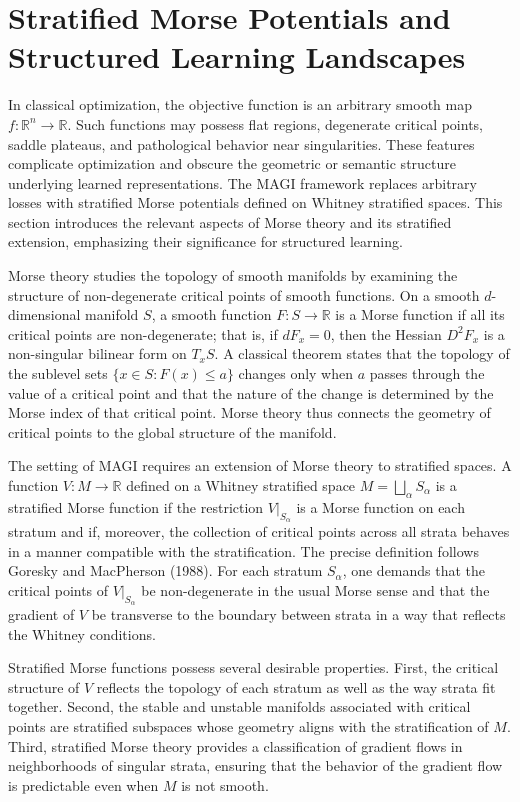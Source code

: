 \documentclass[12pt]{article}
\begin{document}
\section{Stratified Morse Potentials and Structured Learning Landscapes}

In classical optimization, the objective function is an arbitrary smooth map $f : \mathbb{R}^n \to \mathbb{R}$. Such functions may possess flat regions, degenerate critical points, saddle plateaus, and pathological behavior near singularities. These features complicate optimization and obscure the geometric or semantic structure underlying learned representations. The MAGI framework replaces arbitrary losses with stratified Morse potentials defined on Whitney stratified spaces. This section introduces the relevant aspects of Morse theory and its stratified extension, emphasizing their significance for structured learning.

Morse theory studies the topology of smooth manifolds by examining the structure of non-degenerate critical points of smooth functions. On a smooth $d$-dimensional manifold $S$, a smooth function $F : S \to \mathbb{R}$ is a Morse function if all its critical points are non-degenerate; that is, if $dF_x = 0$, then the Hessian $D^2 F_x$ is a non-singular bilinear form on $T_x S$. A classical theorem states that the topology of the sublevel sets $\{x \in S : F(x) \leq a\}$ changes only when $a$ passes through the value of a critical point and that the nature of the change is determined by the Morse index of that critical point. Morse theory thus connects the geometry of critical points to the global structure of the manifold.

The setting of MAGI requires an extension of Morse theory to stratified spaces. A function $V : M \to \mathbb{R}$ defined on a Whitney stratified space $M = \bigsqcup_{\alpha} S_\alpha$ is a stratified Morse function if the restriction $V|_{S_\alpha}$ is a Morse function on each stratum and if, moreover, the collection of critical points across all strata behaves in a manner compatible with the stratification. The precise definition follows Goresky and MacPherson (1988). For each stratum $S_\alpha$, one demands that the critical points of $V|_{S_\alpha}$ be non-degenerate in the usual Morse sense and that the gradient of $V$ be transverse to the boundary between strata in a way that reflects the Whitney conditions.

Stratified Morse functions possess several desirable properties. First, the critical structure of $V$ reflects the topology of each stratum as well as the way strata fit together. Second, the stable and unstable manifolds associated with critical points are stratified subspaces whose geometry aligns with the stratification of $M$. Third, stratified Morse theory provides a classification of gradient flows in neighborhoods of singular strata, ensuring that the behavior of the gradient flow is predictable even when $M$ is not smooth.
\end{document}
